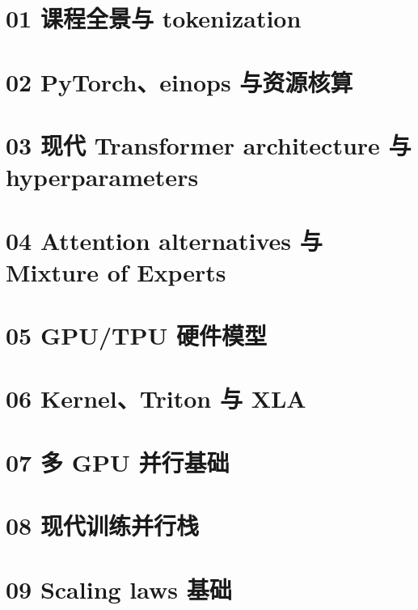 \documentclass[a4paper]{article}
\begin{document}
\section{01 课程全景与 tokenization}

\section{02 PyTorch、einops 与资源核算}

\section{03 现代 Transformer architecture 与 hyperparameters}

\section{04 Attention alternatives 与 Mixture of Experts}

\section{05 GPU/TPU 硬件模型}

\section{06 Kernel、Triton 与 XLA}

\section{07 多 GPU 并行基础}

\section{08 现代训练并行栈}

\section{09 Scaling laws 基础}

\end{document}
